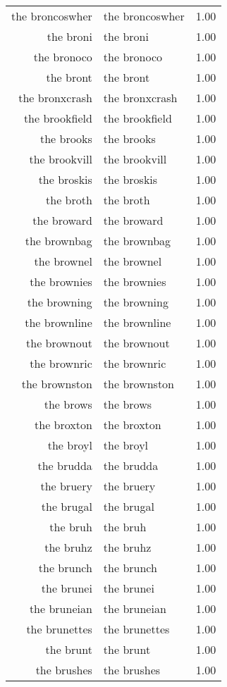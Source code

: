\begin{table}[ht]
\begin{tabular}{rlr}
  the broncoswher & the broncoswher & 1.00 \\ 
  the broni & the broni & 1.00 \\ 
  the bronoco & the bronoco & 1.00 \\ 
  the bront & the bront & 1.00 \\ 
  the bronxcrash & the bronxcrash & 1.00 \\ 
  the brookfield & the brookfield & 1.00 \\ 
  the brooks & the brooks & 1.00 \\ 
  the brookvill & the brookvill & 1.00 \\ 
  the broskis & the broskis & 1.00 \\ 
  the broth & the broth & 1.00 \\ 
  the broward & the broward & 1.00 \\ 
  the brownbag & the brownbag & 1.00 \\ 
  the brownel & the brownel & 1.00 \\ 
  the brownies & the brownies & 1.00 \\ 
  the browning & the browning & 1.00 \\ 
  the brownline & the brownline & 1.00 \\ 
  the brownout & the brownout & 1.00 \\ 
  the brownric & the brownric & 1.00 \\ 
  the brownston & the brownston & 1.00 \\ 
  the brows & the brows & 1.00 \\ 
  the broxton & the broxton & 1.00 \\ 
  the broyl & the broyl & 1.00 \\ 
  the brudda & the brudda & 1.00 \\ 
  the bruery & the bruery & 1.00 \\ 
  the brugal & the brugal & 1.00 \\ 
  the bruh & the bruh & 1.00 \\ 
  the bruhz & the bruhz & 1.00 \\ 
  the brunch & the brunch & 1.00 \\ 
  the brunei & the brunei & 1.00 \\ 
  the bruneian & the bruneian & 1.00 \\ 
  the brunettes & the brunettes & 1.00 \\ 
  the brunt & the brunt & 1.00 \\ 
  the brushes & the brushes & 1.00 \\ 

\end{tabular}
\end{table}
